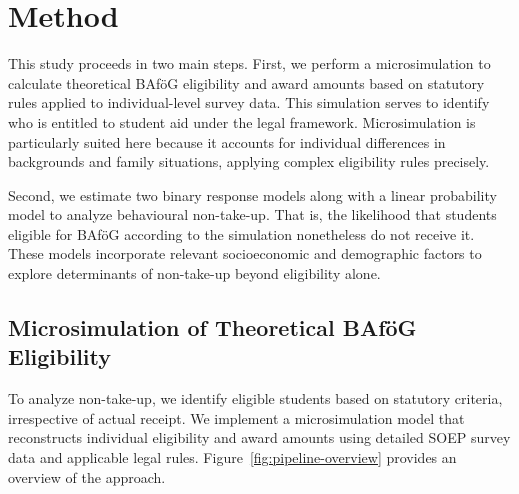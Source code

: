 %
%



\section{Method} 
This study proceeds in two main steps. 
First, we perform a microsimulation to calculate theoretical BAföG eligibility and award amounts based on statutory rules applied to individual-level survey data. 
This simulation serves to identify who is entitled to student aid under the legal framework. Microsimulation is particularly suited here because it accounts for individual differences in backgrounds and family situations, applying complex eligibility rules precisely.

Second, we estimate two binary response models along with a linear probability model to analyze behavioural non-take-up.
That is, the likelihood that students eligible for BAföG according to the simulation nonetheless do not receive it. 
These models incorporate relevant socioeconomic and demographic factors to explore determinants of non-take-up beyond eligibility alone.

%
%
\subsection{Microsimulation of Theoretical BAföG Eligibility}
To analyze non-take-up, we identify eligible students based on statutory criteria, irrespective of actual receipt. 
We implement a microsimulation model that reconstructs individual eligibility and award amounts using detailed SOEP survey data and applicable legal rules. 
Figure~\ref{fig:pipeline-overview} provides an overview of the approach.

